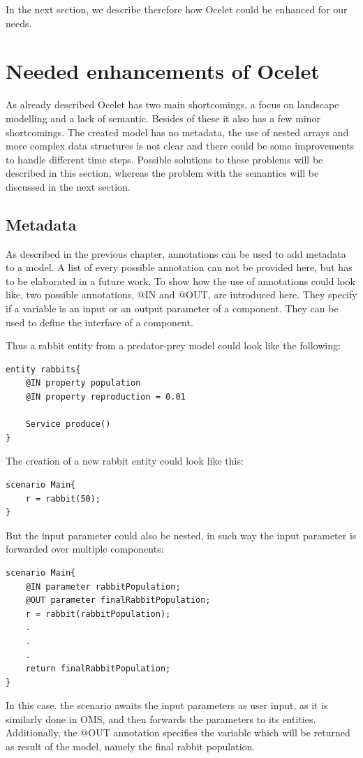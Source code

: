 \par
In the next section, we describe therefore how Ocelet could be enhanced for our needs.

\section{Needed enhancements of Ocelet}
\par
As already described Ocelet has two main shortcomings, a focus on landscape modelling and a lack of semantic. Besides of these it also has a few minor shortcomings. The created model has no metadata, the use of nested arrays and more complex data structures is not clear and there could be some improvements to handle different time steps. Possible solutions to these problems will be described in this section, whereas the problem with the semantics will be discussed in the next section.
\subsection{Metadata}
\par
As described in the previous chapter, annotations can be used to add metadata to a model. A list of every possible annotation can not be provided here, but has to be elaborated in a future work. To show how the use of annotations could look like, two possible annotations, @IN and @OUT, are introduced here. They specify if a variable is an input or an output parameter of a component. They can be used to define the interface of a component.
\par
Thus a rabbit entity from a predator-prey model could look like the following:
\begin{lstlisting}
entity rabbits{
    @IN property population
    @IN property reproduction = 0.01   

    Service produce()
}
\end{lstlisting}
The creation of a new rabbit entity could look like this:
\begin{lstlisting}
scenario Main{
    r = rabbit(50);
}
\end{lstlisting}
But the input parameter could also be nested, in such way the input parameter is forwarded over multiple components:
\begin{lstlisting}
scenario Main{
    @IN parameter rabbitPopulation;
    @OUT parameter finalRabbitPopulation;
    r = rabbit(rabbitPopulation);
    .
    .
    .
    return finalRabbitPopulation;
}
\end{lstlisting}
\par
In this case. the scenario awaits the input parameters as user input, as it is similarly done in OMS, and then forwards the parameters to its entities. Additionally, the @OUT annotation specifies the variable which will be returned as result of the model, namely the final rabbit population.

